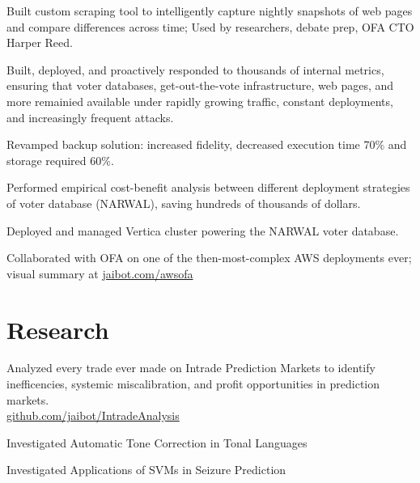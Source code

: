 \documentclass[]{resume}
\begin{document}
\begin{minipage}[t]{0.66\textwidth}
\descript{}
\begin{tightemize}
\item Built custom scraping tool to intelligently capture nightly snapshots of web pages and compare differences across time; Used by researchers, debate prep, OFA CTO Harper Reed.
\item Built, deployed, and proactively responded to thousands of internal metrics, ensuring that voter databases, get-out-the-vote infrastructure, web pages, and more remainied available under rapidly growing traffic, constant deployments, and increasingly frequent attacks.
\item Revamped backup solution: increased fidelity, decreased execution time 70\% and storage required 60\%.
\item Performed empirical cost-benefit analysis between different deployment strategies of voter database (NARWAL), saving hundreds of thousands of dollars.
\item Deployed and managed Vertica cluster powering the NARWAL voter database.
\item Collaborated with OFA on one of the then-most-complex AWS deployments ever; visual summary at \href{http://www.jaibot.com/awsofa}{jaibot.com/awsofa}
\end{tightemize}
\sectionsep


\section{Research}

\sectionsep
{}
Analyzed every trade ever made on Intrade Prediction Markets to identify
inefficencies, systemic miscalibration, and profit opportunities in prediction markets.\\
\href{http://github.com/jaibot/IntradeAnalysis}{github.com/jaibot/IntradeAnalysis }
\sectionsep

Investigated Automatic Tone Correction in Tonal Languages
\sectionsep

Investigated Applications of SVMs in Seizure Prediction
\sectionsep



\end{minipage}
\end{document}
